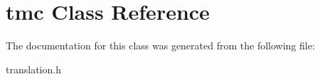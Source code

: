 \hypertarget{classtmc}{}\section{tmc Class Reference}
\label{classtmc}


The documentation for this class was generated from the following file\+:\begin{DoxyCompactItemize}
\item 
translation.\+h\end{DoxyCompactItemize}
